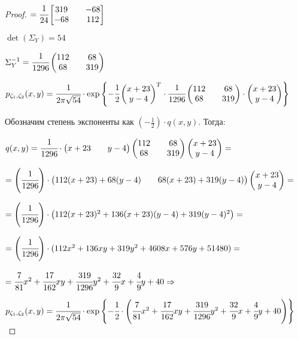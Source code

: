\begin{proof}
	$ =\cfrac1{24}\begin{bmatrix} 319 && -68 \\ -68 && 112 \end{bmatrix} $
	
	$ \det(\Sigma_Y)=54 $
	
	$ \Sigma_Y^{-1}=\cfrac1{1296}\begin{pmatrix} 112 && 68 \\ 68 && 319 \end{pmatrix}$
	
	$ p_{\zeta_1,\zeta_2}(x, y) = \cfrac1{2\pi\sqrt{54}} \cdot \exp \left\{-\cfrac12\begin{pmatrix} x+23 \\ y-4 \end{pmatrix}^T\cdot\cfrac1{1296}\begin{pmatrix} 112 && 68 \\ 68 && 319 \end{pmatrix}\cdot\begin{pmatrix} x+23 \\ y-4 \end{pmatrix}\right\} $
	
	Обозначим степень экспоненты как $\left(-\frac12\right)\cdot q(x, y)$. Тогда:
	
	$ q(x, y)=\cfrac1{1296}\cdot\begin{pmatrix} x+23 && y-4 \end{pmatrix}\begin{pmatrix} 112 && 68 \\ 68 && 319 \end{pmatrix}\begin{pmatrix} x+23 \\ y-4 \end{pmatrix}= $
	
	$ =\left(\cfrac1{1296}\right)\cdot\begin{pmatrix} 112(x+23)+68(y-4) && 68(x+23)+319(y-4) \end{pmatrix}\begin{pmatrix} x+23 \\ y-4 \end{pmatrix}= $
	
	$ =\left(\cfrac1{1296}\right)\cdot\begin{pmatrix} 112(x+23)^2+136(x+23)(y-4)+319(y-4)^2\end{pmatrix}= $
	
	$ =\left(\cfrac1{1296}\right)\cdot(112x^2+136xy+319y^2+4608x+576y+51480)= $
	
	$ =\cfrac7{81}x^2+\cfrac{17}{162}xy+\cfrac{319}{1296}y^2+\cfrac{32}9x+\cfrac49y+40 \Rightarrow $
	  
	\large $ p_{\zeta_1,\zeta_2}(x, y) = \cfrac1{2\pi\sqrt{54}} \cdot \exp \left\{-\cfrac12\cdot\left(\cfrac7{81}x^2+\cfrac{17}{162}xy+\cfrac{319}{1296}y^2+\cfrac{32}9x+\cfrac49y+40\right)\right\} $	  
\end{proof}

